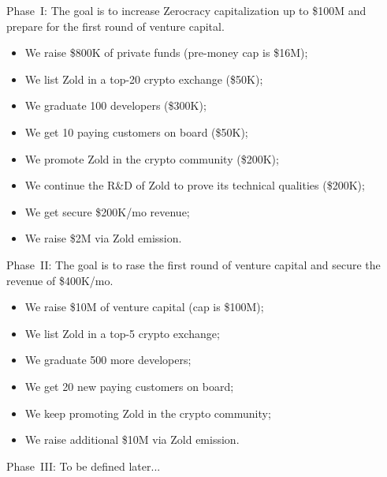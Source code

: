 \documentclass{main}
\begin{document}
Phase~I: The goal is to increase Zerocracy capitalization
up to \$100M and prepare for the first round of venture capital.

\begin{itemize}\itemsep0em
  \item We raise \$800K of private funds (pre-money cap is \$16M);
  \item We list Zold in a top-20 crypto exchange (\$50K);
  \item We graduate 100 developers (\$300K);
  \item We get 10 paying customers on board (\$50K);
  \item We promote Zold in the crypto community (\$200K);
  \item We continue the R\&D of Zold to prove its technical qualities (\$200K);
  \item We get secure \$200K/mo revenue;
  \item We raise \$2M via Zold emission.
\end{itemize}

Phase~II: The goal is to rase the first round of venture capital and
secure the revenue of \$400K/mo.

\begin{itemize}\itemsep0em
  \item We raise \$10M of venture capital (cap is \$100M);
  \item We list Zold in a top-5 crypto exchange;
  \item We graduate 500 more developers;
  \item We get 20 new paying customers on board;
  \item We keep promoting Zold in the crypto community;
  \item We raise additional \$10M via Zold emission.
\end{itemize}

Phase~III: To be defined later...
\end{document}
